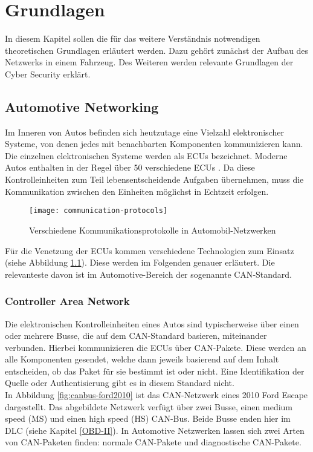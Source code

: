 \chapter{Grundlagen}
In diesem Kapitel sollen die für das weitere Verständnis notwendigen theoretischen Grundlagen erläutert werden. Dazu gehört zunächst der Aufbau des Netzwerks in einem Fahrzeug. Des Weiteren werden relevante Grundlagen der Cyber Security erklärt.

\section{Automotive Networking}
Im Inneren von Autos befinden sich heutzutage eine Vielzahl elektronischer Systeme, von denen jedes mit benachbarten Komponenten kommunizieren kann. Die einzelnen elektronischen Systeme werden als \acp{ECU} bezeichnet. Moderne Autos enthalten in der Regel über 50 verschiedene \acsp{ECU} \cite[vgl.][6]{Miller.2013}. Da diese Kontrolleinheiten zum Teil lebensentscheidende Aufgaben übernehmen, muss die Kommunikation zwischen den Einheiten möglichst in Echtzeit erfolgen. \\

\begin{figure}[H]
\centering
\texttt{[image: communication-protocols]}
\label{fig:communication-protocols}
\caption{Verschiedene Kommunikationsprotokolle in Automobil-Netzwerken}
\end{figure}

Für die Venetzung der \acsp{ECU} kommen verschiedene Technologien zum Einsatz (siehe Abbildung \ref{fig:communication-protocols}). Diese werden im Folgenden genauer erläutert. Die relevanteste davon ist im Automotive-Bereich der sogenannte \acs{CAN}-Standard.

\subsection{Controller Area Network}
Die elektronischen Kontrolleinheiten eines Autos sind typischerweise über einen oder mehrere Busse, die auf dem \ac{CAN}-Standard basieren, miteinander verbunden. Hierbei kommunizieren die \acsp{ECU} über \acs{CAN}-Pakete. Diese werden an alle Komponenten gesendet, welche dann jeweils basierend auf dem Inhalt entscheiden, ob das Paket für sie bestimmt ist oder nicht. Eine Identifikation der Quelle oder Authentisierung gibt es in diesem Standard nicht. \cite[vgl.][7]{Miller.2013} \\
In Abbildung \ref{fig:canbus-ford2010} ist das \acs{CAN}-Netzwerk eines 2010 Ford Escape dargestellt. Das abgebildete Netzwerk verfügt über zwei Busse, einen medium speed (MS) und einen high speed (HS) \acs{CAN}-Bus. Beide Busse enden hier im \ac{DLC} (siehe Kapitel \ref{OBD-II}).
In Automotive Netzwerken lassen sich zwei Arten von \acs{CAN}-Paketen finden: normale \acs{CAN}-Pakete und diagnostische \acs{CAN}-Pakete. 

